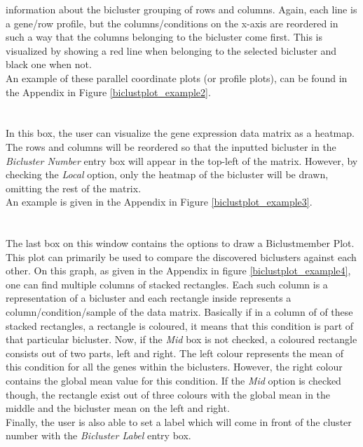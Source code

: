 \documentclass[a4paper]{article}\usepackage[]{graphicx}\usepackage[]{color}
\begin{document}
information about the bicluster grouping of rows and columns. Again, each line
is a gene/row profile, but the columns/conditions on the x-axis are reordered in
such a way that the columns belonging to the bicluster come first. This is
visualized by showing a red line when belonging to the selected bicluster and
black one when not.\\
An example of these parallel coordinate plots (or profile plots), can be found
in the Appendix in Figure \ref{biclustplot_example2}.
\\ \\
\\
In this box, the user can visualize the gene expression data matrix as a
heatmap. The rows and columns will be reordered so that the inputted bicluster
in the {\it Bicluster Number} entry box will appear in the top-left of the
matrix.
However, by checking the {\it Local} option, only the heatmap of the bicluster
will be drawn, omitting the rest of the matrix.\\
An example is given in the Appendix in Figure \ref{biclustplot_example3}.
\\ \\
\\
\noindent The last box on this window contains the options to draw a
Biclustmember Plot. This plot can primarily be used to compare the discovered
biclusters against each other. On this graph, as given in the Appendix in figure
\ref{biclustplot_example4}, one can find multiple columns of stacked rectangles.
Each such column is a representation of a bicluster and each rectangle inside
represents a column/condition/sample of the data matrix. Basically if in a
column of of these stacked rectangles, a rectangle is coloured, it means that
this condition is part of that particular bicluster. Now, if the {\it Mid} box
is not checked, a coloured rectangle consists out of two parts, left and right.
The left colour represents the mean of this condition for all the genes within
the biclusters. However, the right colour contains the global mean value for
this condition. If the {\it Mid} option is checked though, the rectangle exist out of
three colours with the global mean in the middle and the bicluster mean on the
left and right.\\
Finally, the user is also able to set a label which will come in front of the
cluster number with the {\it Bicluster Label} entry box.
\\ \\
\end{document}
